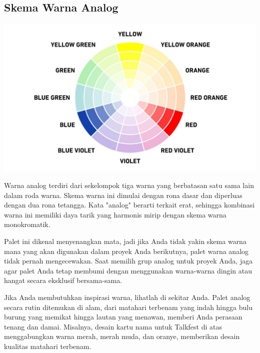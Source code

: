 \documentclass[a4paper]{article}
\begin{document}
\subsection{Skema Warna Analog}
\begin{center}
  \includegraphics[width=\textwidth]{resources/triadic.jpg}
\end{center}
Warna analog terdiri dari sekelompok tiga warna yang berbatasan satu sama lain dalam roda warna. Skema warna ini dimulai dengan rona dasar dan diperluas dengan dua rona tetangga. Kata "analog" berarti terkait erat, sehingga kombinasi warna ini memiliki daya tarik yang harmonis mirip dengan skema warna monokromatik.

Palet ini dikenal menyenangkan mata, jadi jika Anda tidak yakin skema warna mana yang akan digunakan dalam proyek Anda berikutnya, palet warna analog tidak pernah mengecewakan. Saat memilih grup analog untuk proyek Anda, jaga agar palet Anda tetap membumi dengan menggunakan warna-warna dingin atau hangat secara eksklusif bersama-sama.

Jika Anda membutuhkan inspirasi warna, lihatlah di sekitar Anda. Palet analog secara rutin ditemukan di alam, dari matahari terbenam yang indah hingga bulu burung yang memikat hingga lautan yang menawan, memberi Anda perasaan tenang dan damai. Misalnya, desain kartu nama untuk Talkfest di atas menggabungkan warna merah, merah muda, dan oranye, memberikan desain kualitas matahari terbenam.
\end{document}
